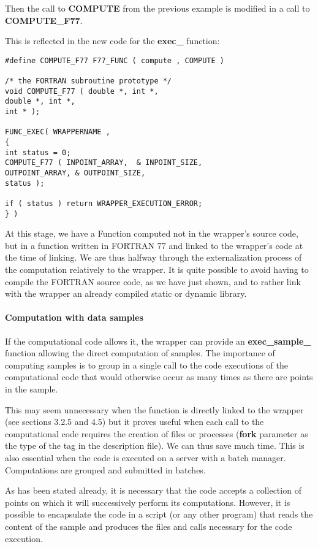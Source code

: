 Then the call to {\bf COMPUTE} from the previous example is modified in a call to {\bf COMPUTE\_F77}.

This is reflected in the new code for the {\bf exec\_} function:

\lstset{language=C++, basicstyle=\normalsize}
\begin{lstlisting}[frame=TBRL]
#define COMPUTE_F77 F77_FUNC ( compute , COMPUTE )

/* the FORTRAN subroutine prototype */
void COMPUTE_F77 ( double *, int *,
double *, int *,
int * );

FUNC_EXEC( WRAPPERNAME ,
{
int status = 0;
COMPUTE_F77 ( INPOINT_ARRAY,  & INPOINT_SIZE,
OUTPOINT_ARRAY, & OUTPOINT_SIZE,
status );

if ( status ) return WRAPPER_EXECUTION_ERROR;
} )
\end{lstlisting}

At this stage, we have a Function computed not in the wrapper's source code, but in a function written in FORTRAN 77 and linked to the wrapper's code at the time of linking. We are thus halfway through the externalization process of the computation relatively to the wrapper. It is quite possible to avoid having to compile the FORTRAN source code, as we have just shown, and to rather link with the wrapper an already compiled static or dynamic library.

\paragraph{Computation with data samples}

If the computational code allows it, the wrapper can provide an {\bf exec\_sample\_} function allowing the direct computation of samples. The importance of computing samples is to group in a single call to the code executions of the computational code that would otherwise occur as many times as there are points in the sample.

This may seem unnecessary when the function is directly linked to the wrapper (see sections 3.2.5 and 4.5) but it proves useful when each call to the computational code requires the creation of files or processes ({\bf fork} parameter as the type of the {\bf <wrap-mode>} tag in the description file). We can thus save much time. This is also essential when the code is executed on a server with a batch manager. Computations are grouped and submitted in batches.

As has been stated already, it is necessary that the code accepts a collection of points on which it will successively perform its computations. However, it is possible to encapsulate the code in a script (or any other program) that reads the content of the sample and produces the files and calls necessary for the code execution.


